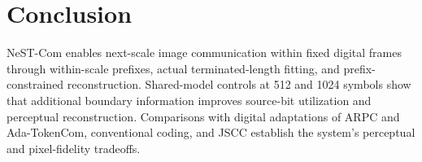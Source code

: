 \section{Conclusion}
NeST-Com enables next-scale image communication within fixed digital frames through within-scale prefixes, actual terminated-length fitting, and prefix-constrained reconstruction. Shared-model controls at 512 and 1024 symbols show that additional boundary information improves source-bit utilization and perceptual reconstruction. Comparisons with digital adaptations of ARPC and Ada-TokenCom, conventional coding, and JSCC establish the system's perceptual and pixel-fidelity tradeoffs.
